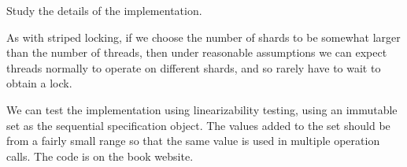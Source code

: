 \begin{instruction}
Study the details of the implementation.
\end{instruction}

As with striped locking, if we choose the number of shards to be somewhat
larger than the number of threads, then under reasonable assumptions we can
expect threads normally to operate on different shards, and so rarely have to
wait to obtain a lock.

We can test the implementation using linearizability
testing, using an immutable set as the
sequential specification object.  The values added to the set should be from a
fairly small range so that the same value is used in multiple operation calls.
The code is on the book website.

